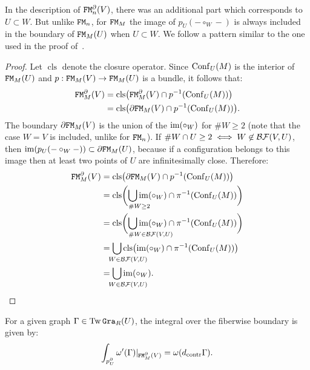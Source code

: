 In the description of $\mathtt{FM}_{n}^{\partial}(V)$, there was an additional part which corresponds to $U \subset W$.
But unlike $\mathtt{FM}_{n}$, for $\mathtt{FM}_{M}$ the image of $p_{U} (- \circ_{W} -)$ is always included in the boundary of $\mathtt{FM}_{M}(U)$ when $U \subset W$.
We follow a pattern similar to the one used in the proof of~\cite[Proposition 5.7.1]{LambrechtsVolic2014}.

\begin{proof}
  Let $\operatorname{cls}$ denote the closure operator.
  Since $\operatorname{Conf}_{U}(M)$ is the interior of $\mathtt{FM}_{M}(U)$ and $p : \mathtt{FM}_{M}(V) \to \mathtt{FM}_{M}(U)$ is a bundle, it follows that:
  \begin{align*}
    \mathtt{FM}_{M}^{\partial}(V)
    & = \operatorname{cls} \bigl( \mathtt{FM}_{M}^{\partial}(V) \cap p^{-1}(\operatorname{Conf}_{U}(M)) \bigr) \\
    & = \operatorname{cls} \bigl( \partial \mathtt{FM}_{M}(V) \cap p^{-1}(\operatorname{Conf}_{U}(M)) \bigr).
  \end{align*}
  The boundary $\partial \mathtt{FM}_{M}(V)$ is the union of the $\operatorname{im}(\circ_{W})$ for $\# W \geq 2$ (note that the case $W = V$ is included, unlike for $\mathtt{FM}_{n}$).
  If $\# W \cap U \geq 2 \iff W \not\in \mathcal{BF}(V,U)$, then $\operatorname{im}(p_{U}(- \circ_{W} -)) \subset \partial \mathtt{FM}_{M}(U)$, because if a configuration belongs to this image then at least two points of $U$ are infinitesimally close.
  Therefore:
  \begin{align*}
    \FM_{M}^{\partial}(V)
    & = \operatorname{cls} \bigl( \partial \FM_{M}(V) \cap p^{-1}(\Conf_{U}(M)) \bigr) \\
    & = \operatorname{cls} \biggl( \bigcup_{\hspace{-1em} \mathrlap{\# W \geq 2}} \im (\circ_{W}) \cap \pi^{-1}(\Conf_{U}(M)) \biggr) \\
    & = \operatorname{cls} \biggl( \bigcup_{\hspace{-1em} \mathrlap{\# W \in \BF(V,U)}} \im (\circ_{W}) \cap \pi^{-1}(\Conf_{U}(M)) \biggr) \\
    & = \bigcup_{\hspace{-2em} \mathrlap{W \in \BF(V,U)}} \operatorname{cls} \bigl( \im(\circ_{W}) \cap \pi^{-1}(\Conf_{U}(M)) \bigr) \\
    & = \bigcup_{\hspace{-2em} \mathrlap{W \in \BF(V,U)}} \im(\circ_{W}).
      \qedhere
  \end{align*}
\end{proof}

\begin{lemma}
  \label{cnf.lemma.int-partial-omega}
  For a given graph $\Gamma \in \operatorname{Tw}\mathtt{Gra}_{R}(U)$, the integral over the fiberwise boundary is given by:
  \[ \int_{p_{U}^{\partial}} \omega'(\Gamma)|_{\mathtt{FM}_{M}^{\partial}(V)} = \omega(d_{\mathrm{contr}} \Gamma). \]
\end{lemma}

